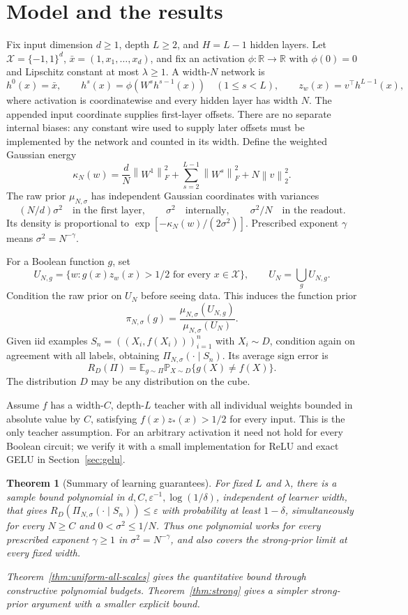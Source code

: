 \documentclass[11pt]{article}
\newtheorem{theorem}{Theorem}[section]
\theoremstyle{remark}\newtheorem{remark}[theorem]{Remark}
\newcommand{\R}{\mathbb R}\newcommand{\E}{\mathbb E}\newcommand{\Prb}{\mathbb P}
\newcommand{\norm}[1]{\left\lVert#1\right\rVert}
\newcommand{\cX}{\mathcal X}\newcommand{\cF}{\mathcal F}\newcommand{\cG}{\mathcal G}
\begin{document}
\section{Model and the results}
Fix input dimension $d\ge1$, depth $L\ge2$, and $H=L-1$ hidden layers. Let $\cX=\{-1,1\}^d$, $\bar x=(1,x_1,\ldots,x_d)$, and fix an activation $\phi:\R\to\R$ with $\phi(0)=0$ and Lipschitz constant at most $\lambda\ge1$. A width-$N$ network is
\[
 h^0(x)=\bar x,\qquad h^s(x)=\phi(W^s h^{s-1}(x))\quad(1\le s<L),
 \qquad z_w(x)=v^\top h^{L-1}(x),
\]
where activation is coordinatewise and every hidden layer has width $N$. The appended input coordinate supplies first-layer offsets. There are no separate internal biases: any constant wire used to supply later offsets must be implemented by the network and counted in its width. Define the weighted Gaussian energy
\begin{equation}\label{eq:energy}
 \kappa_N(w)=\frac dN\norm{W^1}_F^2+
 \sum_{s=2}^{L-1}\norm{W^s}_F^2+N\norm v_2^2.
\end{equation}
The raw prior $\mu_{N,\sigma}$ has independent Gaussian coordinates with variances
\[
 (N/d)\sigma^2\quad\text{in the first layer},\qquad
 \sigma^2\quad\text{internally},\qquad
 \sigma^2/N\quad\text{in the readout}.
\]
Its density is proportional to $\exp[-\kappa_N(w)/(2\sigma^2)]$. Prescribed exponent $\gamma$ means $\sigma^2=N^{-\gamma}$.

For a Boolean function $g$, set
\[
 U_{N,g}=\{w:g(x)z_w(x)>1/2\text{ for every }x\in\cX\},
 \qquad U_N=\bigcup_g U_{N,g}.
\]
Condition the raw prior on $U_N$ before seeing data. This induces the function prior
\[
 \pi_{N,\sigma}(g)=\frac{\mu_{N,\sigma}(U_{N,g})}{\mu_{N,\sigma}(U_N)}.
\]
Given iid examples $S_n=((X_i,f(X_i)))_{i=1}^n$ with $X_i\sim D$, condition again on agreement with all labels, obtaining $\Pi_{N,\sigma}(\cdot\mid S_n)$. Its average sign error is
\[
 R_D(\Pi)=\E_{g\sim\Pi}\Prb_{X\sim D}\{g(X)\ne f(X)\}.
\]
The distribution $D$ may be any distribution on the cube.

Assume $f$ has a width-$C$, depth-$L$ teacher with all individual weights bounded in absolute value by $C$, satisfying $f(x)z_*(x)>1/2$ for every input. This is the only teacher assumption. For an arbitrary activation it need not hold for every Boolean circuit; we verify it with a small implementation for ReLU and exact GELU in Section~\ref{sec:gelu}.

\begin{theorem}[Summary of learning guarantees]\label{thm:summary}
For fixed $L$ and $\lambda$, there is a sample bound polynomial in
$d,C,\varepsilon^{-1},\log(1/\delta)$, independent of learner width,
that gives $R_D(\Pi_{N,\sigma}(\cdot\mid S_n))\le\varepsilon$ with
probability at least $1-\delta$, simultaneously for every $N\ge C$ and
$0<\sigma^2\le1/N$. Thus one polynomial works for every prescribed
exponent $\gamma\ge1$ in $\sigma^2=N^{-\gamma}$, and also covers the
strong-prior limit at every fixed width.

Theorem~\ref{thm:uniform-all-scales} gives the quantitative bound through
constructive polynomial budgets. Theorem~\ref{thm:strong} gives a simpler
strong-prior argument with a smaller explicit bound.
\end{theorem}
\end{document}

